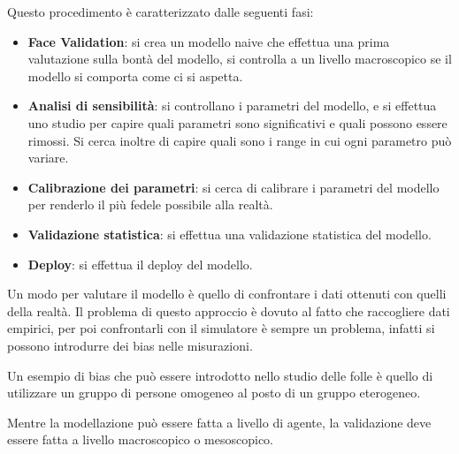 Questo procedimento è caratterizzato dalle seguenti fasi:
\begin{itemize}
    \item \textbf{Face Validation}: si crea un modello naive che effettua una prima
          valutazione sulla bontà del modello, si controlla a un livello macroscopico
          se il modello si comporta come ci si aspetta.
    \item \textbf{Analisi di sensibilità}: si controllano i parametri del modello,
          e si effettua uno studio per capire quali parametri sono significativi
          e quali possono essere rimossi. Si cerca inoltre di capire quali sono
          i range in cui ogni parametro può variare.
    \item \textbf{Calibrazione dei parametri}: si cerca di calibrare i parametri
          del modello per renderlo il più fedele possibile alla realtà.
    \item \textbf{Validazione statistica}: si effettua una validazione statistica del
          modello.
    \item \textbf{Deploy}: si effettua il deploy del modello.
\end{itemize}

Un modo per valutare il modello è quello di confrontare i dati ottenuti con quelli
della realtà. Il problema di questo approccio è dovuto al fatto che raccogliere
dati empirici, per poi confrontarli con il simulatore è sempre un problema,
infatti si possono introdurre dei bias nelle misurazioni.

Un esempio di bias che può essere introdotto nello studio delle folle è quello
di utilizzare un gruppo di persone omogeneo al posto di un gruppo eterogeneo.

Mentre la modellazione può essere fatta a livello di agente, la validazione 
deve essere fatta a livello macroscopico o mesoscopico.